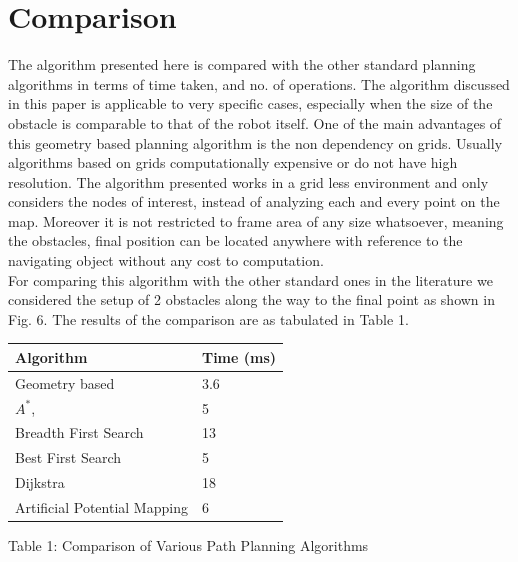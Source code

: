\documentclass[letterpaper, 10 pt, conference]{ieeeconf}  %
\begin{document}
\section{Comparison}
The algorithm presented here is compared with the other standard planning algorithms in terms of time taken, and no. of operations. The algorithm discussed in this paper is applicable to very specific cases, especially when the size of the obstacle is comparable to that of the robot itself. One of the main advantages of this geometry based planning algorithm is the non dependency on grids. Usually algorithms based on grids computationally expensive or do not have high resolution. The algorithm presented works in a grid less environment and only considers the nodes of interest, instead of analyzing each and every point on the map. Moreover it is not restricted to frame area of any size whatsoever, meaning the obstacles, final position can be located anywhere with reference to the navigating object without any cost to computation.\\
For comparing this algorithm with the other standard ones in the literature we considered the setup of 2 obstacles along the way to the final point as shown in Fig. 6. The results of the comparison are as tabulated in Table 1.\\


\begin{center} 
    \begin{tabular}{| p{3cm} | l | }
    \hline
    \textbf{Algorithm} & \textbf{Time (ms)}  \\ \hline
    Geometry based & 3.6 \\ \hline
    $A^{*}$,  & 5 \\ \hline
    Breadth First Search & 13 \\
    \hline
    Best First Search & 5   \\ \hline
    Dijkstra & 18 \\ \hline
    Artificial Potential Mapping & 6 \\ \hline
    \end{tabular}
\end{center}
\begin{center}
\small{Table 1: Comparison of Various Path Planning Algorithms\\}
\end{center}
\end{document}
